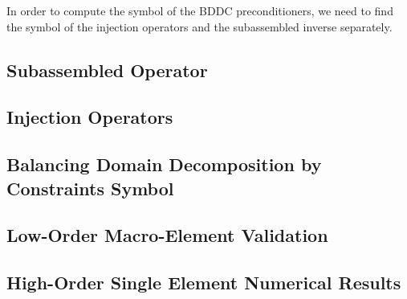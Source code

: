 In order to compute the symbol of the BDDC preconditioners, we need to find the symbol of the injection operators and the subassembled inverse separately.

\subsection{Subassembled Operator}


\subsection{Injection Operators}


\subsection{Balancing Domain Decomposition by Constraints Symbol}


\subsection{Low-Order Macro-Element Validation}


\subsection{High-Order Single Element Numerical Results}

